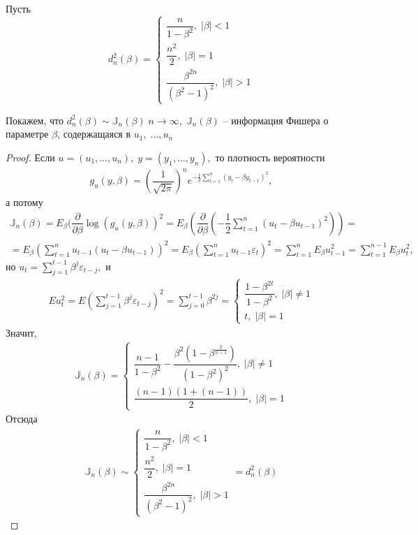 \begin{theorem}
    Пусть 
    $$d_n^2(\beta) = 
        \begin{cases}
            \dfrac{n}{1 - \beta^2}, \; |\beta| < 1 \\
            \dfrac{n^2}{2}, \; |\beta| = 1 \\
            \dfrac{\beta^{2n}}{(\beta^2 - 1)^2}, \; |\beta| > 1
        \end{cases}$$

    Покажем, что $ d_n^2(\beta) \sim \mathbb{J}_n(\beta) \; n \longrightarrow \infty, \; \mathbb{J}_n(\beta) $ -- информация Фишера о параметре $ \beta $, содержащаяся в $ u_1, \; \ldots, u_n $ 
\end{theorem}
\begin{proof}
Если $ u = (u_1, \ldots, u_n), \; y = (y_1, \ldots, y_n),  $ то плотность вероятности 
$$\begin{gathered}
    g_u(y, \beta) = (\dfrac{1}{\sqrt{2 \pi}})^n e^{-\frac{1}{2} \sum\limits_{t = 1}^n(y_t - \beta y_{t - 1})^2},
\end{gathered}$$
а потому
$$\begin{gathered}
    \mathbb{J}_n(\beta) = E_\beta(\dfrac{\partial}{\partial \beta} \log(g_u(y, \beta))^2 = E_\beta(\dfrac{\partial}{\partial \beta} (-\dfrac{1}{2}\sum\limits_{t = 1}^n (u_t - \beta u_{t - 1})^2)) = \\
    = E_\beta(\sum\limits_{t = 1}^n u_{t - 1}(u_t - \beta u_{t - 1}))^2 = E_\beta(\sum\limits_{t = 1}^n u_{t - 1}\varepsilon_t)^2 = \sum\limits_{t = 1}^n E_\beta u_{t - 1}^2 = \sum\limits_{t = 1}^{n - 1} E_\beta u_{t}^2,
\end{gathered}$$
но $ u_t = \sum\limits_{j = 1}^{t - 1}\beta^j \varepsilon_{t - j}, $ и
$$\begin{gathered}
    Eu_t^2 = E(\sum\limits_{j = 1}^{t - 1}\beta^j \varepsilon_{t - j})^2 = \sum\limits_{j = 0}^{t - 1}\beta^{2j} =
    \begin{cases}
        \dfrac{1 - \beta^{2t}}{1 - \beta^2}, \; |\beta| \neq 1 \\
        t, \; |\beta| = 1
    \end{cases}
\end{gathered}$$
Значит, 
$$\begin{gathered}
    \mathbb{J}_n(\beta) =
    \begin{cases}
        \dfrac{n - 1}{1 - \beta^2} - \dfrac{\beta^2(1 - \beta^{\frac{2}{n - 1}})}{(1 - \beta^2)^2}, \; |\beta| \neq 1\\
        \dfrac{(n - 1)(1 + (n - 1))}{2}, \; |\beta| = 1
    \end{cases}
\end{gathered}$$
Отсюда
$$\begin{gathered}
    \mathbb{J}_n(\beta) \sim
    \begin{cases}
        \dfrac{n}{1 - \beta^2}, \; |\beta| < 1 \\
        \dfrac{n^2}{2}, \; |\beta| = 1 \\
        \dfrac{\beta^{2n}}{(\beta^2 - 1)^2}, \; |\beta| > 1
    \end{cases}
    = 
    d_n^2(\beta)
\end{gathered}$$
\end{proof}

